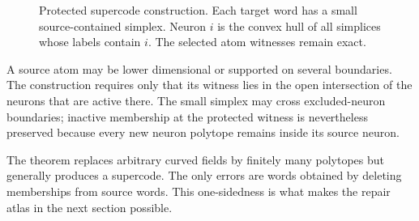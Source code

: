\begin{figure}[t]
\centering

\caption{Protected supercode construction.  Each target word has a small source-contained simplex.  Neuron $i$ is the convex hull of all simplices whose labels contain $i$.  The selected atom witnesses remain exact.}
\label{fig:protected-supercode}
\end{figure}

\begin{remark}
A source atom may be lower dimensional or supported on several boundaries.  The construction requires only that its witness lies in the open intersection of the neurons that are active there.  The small simplex may cross excluded-neuron boundaries; inactive membership at the protected witness is nevertheless preserved because every new neuron polytope remains inside its source neuron.
\end{remark}

\begin{remark}
The theorem replaces arbitrary curved fields by finitely many polytopes but generally produces a supercode.  The only errors are words obtained by deleting memberships from source words.  This one-sidedness is what makes the repair atlas in the next section possible.
\end{remark}
